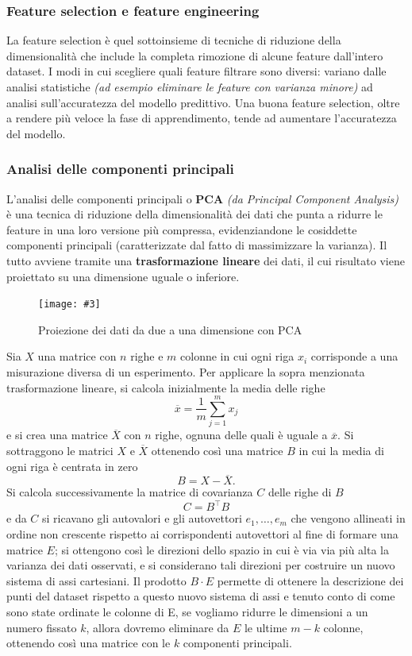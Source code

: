 \documentclass[12pt, twoside, letterpaper]{report}
\newcommand{\img}[4] {
	\begin{figure}
		\centering
		\texttt{[image: \#3]}\\
		\caption{#1}
		\label{fig:#4}
	\end{figure}
}
\begin{document}
				\subsubsection{Feature selection e feature engineering} La feature selection è quel sottoinsieme di tecniche di riduzione della dimensionalità che include la completa rimozione di alcune feature dall'intero dataset. I modi in cui scegliere quali feature filtrare sono diversi: variano dalle analisi statistiche \textit{(ad esempio eliminare le feature con varianza minore)} ad analisi sull'accuratezza del modello predittivo. Una buona feature selection, oltre a rendere più veloce la fase di apprendimento, tende ad aumentare l'accuratezza del modello. %
				
				\subsubsection{Analisi delle componenti principali} L'analisi delle componenti principali o \textbf{PCA} \textit{(da Principal Component Analysis)} è una tecnica di riduzione della dimensionalità dei dati che punta a ridurre le feature in una loro versione più compressa, evidenziandone le cosiddette componenti principali (caratterizzate dal fatto di massimizzare la varianza). Il tutto avviene tramite una \textbf{trasformazione lineare} dei dati, il cui risultato viene proiettato su una dimensione uguale o inferiore.
				\img{Proiezione dei dati da due a una dimensione con PCA \cite{bitsofdna}}{0.3}{pca.jpg}{pca}
				Sia $X$ una matrice con $n$ righe e $m$ colonne in cui ogni riga $x_i$ corrisponde a una misurazione diversa di un esperimento.  Per applicare la sopra menzionata trasformazione lineare, si calcola inizialmente la media delle righe 
				$$\overline{x}= \frac{1}{m} \sum_{j=1}^m x_j$$ 
				e si crea una matrice $\overline{X}$ con $n$ righe, ognuna delle quali è uguale a $\overline{x}$. Si sottraggono le matrici $X$ e $\overline{X}$ ottenendo così una matrice $B$ in cui la media di ogni riga è centrata in zero
				$$B = X - \overline{X}.$$
					 Si calcola successivamente la matrice di covarianza $C$ delle righe di $B$
					 $$C = B^\top B$$
					 e da $C$ si ricavano gli autovalori e gli autovettori $e_1, \dots, e_m$ che vengono allineati in ordine non crescente rispetto ai corrispondenti autovettori al fine di formare una matrice $E$; si ottengono così le direzioni dello spazio in cui è via via più alta la varianza dei dati osservati, e si considerano tali direzioni per costruire un nuovo sistema di assi cartesiani. Il prodotto $B \cdot E$ permette di ottenere la descrizione dei punti del dataset rispetto a questo nuovo sistema di assi e tenuto conto di come sono state ordinate le colonne di E, se vogliamo ridurre le dimensioni a un numero fissato $k$, allora dovremo eliminare da $E$ le ultime $m-k$ colonne, ottenendo così una matrice con le $k$ componenti principali.  	 
				
\end{document}
